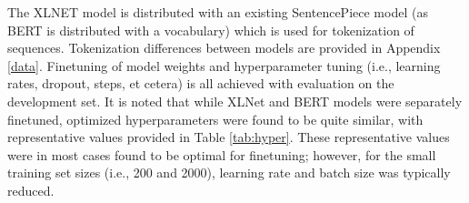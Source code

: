 \documentclass[twoside,twocolumn,10pt]{article}
\begin{document}
 The XLNET model is distributed with an existing SentencePiece model (as BERT is distributed with a vocabulary) which is used for tokenization of sequences. Tokenization differences between models are provided in Appendix \ref{data}.  Finetuning of model weights and hyperparameter tuning (i.e., learning rates, dropout, steps, et cetera) is all achieved with evaluation on the development set. It is noted that while XLNet and BERT models were separately finetuned, optimized hyperparameters were found to be quite similar, with representative values provided in Table \ref{tab:hyper}. These representative values were in most cases found to be optimal for finetuning; however, for the small training set sizes (i.e., 200 and 2000), learning rate and batch size was typically reduced.
 
 \begin{table}
 	\caption{Comparison of Optimized Hyperparameters}\label{tab:hyper}
 	\centering
 \end{table} 
 
\end{document}
